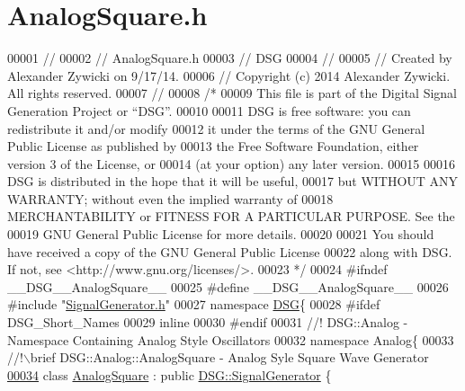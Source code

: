 \hypertarget{_analog_square_8h_source}{\section{Analog\+Square.\+h}
\label{_analog_square_8h_source}
}

\begin{DoxyCode}
00001 \textcolor{comment}{//}
00002 \textcolor{comment}{//  AnalogSquare.h}
00003 \textcolor{comment}{//  DSG}
00004 \textcolor{comment}{//}
00005 \textcolor{comment}{//  Created by Alexander Zywicki on 9/17/14.}
00006 \textcolor{comment}{//  Copyright (c) 2014 Alexander Zywicki. All rights reserved.}
00007 \textcolor{comment}{//}
00008 \textcolor{comment}{/*}
00009 \textcolor{comment}{ This file is part of the Digital Signal Generation Project or “DSG”.}
00010 \textcolor{comment}{}
00011 \textcolor{comment}{ DSG is free software: you can redistribute it and/or modify}
00012 \textcolor{comment}{ it under the terms of the GNU General Public License as published by}
00013 \textcolor{comment}{ the Free Software Foundation, either version 3 of the License, or}
00014 \textcolor{comment}{ (at your option) any later version.}
00015 \textcolor{comment}{}
00016 \textcolor{comment}{ DSG is distributed in the hope that it will be useful,}
00017 \textcolor{comment}{ but WITHOUT ANY WARRANTY; without even the implied warranty of}
00018 \textcolor{comment}{ MERCHANTABILITY or FITNESS FOR A PARTICULAR PURPOSE.  See the}
00019 \textcolor{comment}{ GNU General Public License for more details.}
00020 \textcolor{comment}{}
00021 \textcolor{comment}{ You should have received a copy of the GNU General Public License}
00022 \textcolor{comment}{ along with DSG.  If not, see <http://www.gnu.org/licenses/>.}
00023 \textcolor{comment}{ */}
00024 \textcolor{preprocessor}{#ifndef \_\_DSG\_\_AnalogSquare\_\_}
00025 \textcolor{preprocessor}{#define \_\_DSG\_\_AnalogSquare\_\_}
00026 \textcolor{preprocessor}{#include "\hyperlink{_signal_generator_8h}{SignalGenerator.h}"}
00027 \textcolor{keyword}{namespace }\hyperlink{namespace_d_s_g}{DSG}\{
00028 \textcolor{preprocessor}{#ifdef DSG\_Short\_Names}
00029     \textcolor{keyword}{inline}
00030 \textcolor{preprocessor}{#endif}
00031 \textcolor{comment}{    //! DSG::Analog - Namespace Containing Analog Style Oscillators}
00032 \textcolor{comment}{}    \textcolor{keyword}{namespace }Analog\{\textcolor{comment}{}
00033 \textcolor{comment}{        //!\(\backslash\)brief DSG::Analog::AnalogSquare - Analog Syle Square Wave Generator}
\hypertarget{_analog_square_8h_source_l00034}{}\hyperlink{class_d_s_g_1_1_analog_1_1_analog_square}{00034} \textcolor{comment}{}        \textcolor{keyword}{class }\hyperlink{class_d_s_g_1_1_analog_1_1_analog_square}{AnalogSquare} : \textcolor{keyword}{public} \hyperlink{class_d_s_g_1_1_signal_generator}{DSG::SignalGenerator} \{

\end{DoxyCode}
